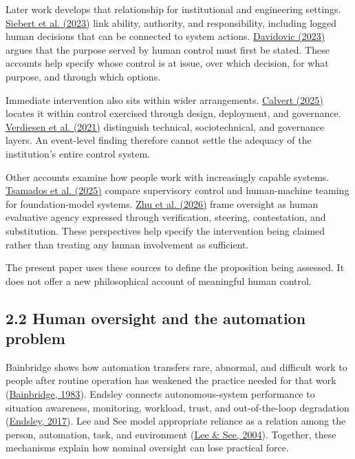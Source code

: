 \documentclass[11pt]{article}
\begin{document}
Later work develops that relationship for institutional and engineering settings. \href{https://doi.org/10.1007/s43681-022-00167-3}{Siebert et al. (2023)} link ability, authority, and responsibility, including logged human decisions that can be connected to system actions. \href{https://doi.org/10.3389/fdata.2022.1017677}{Davidovic (2023)} argues that the purpose served by human control must first be stated. These accounts help specify whose control is at issue, over which decision, for what purpose, and through which options.

Immediate intervention also sits within wider arrangements. \href{https://doi.org/10.1007/s11948-025-00554-z}{Calvert (2025)} locates it within control exercised through design, deployment, and governance. \href{https://doi.org/10.1007/s11023-020-09532-9}{Verdiesen et al. (2021)} distinguish technical, sociotechnical, and governance layers. An event-level finding therefore cannot settle the adequacy of the institution's entire control system.

Other accounts examine how people work with increasingly capable systems. \href{https://doi.org/10.1007/s43681-024-00489-4}{Tsamados et al. (2025)} compare supervisory control and human-machine teaming for foundation-model systems. \href{https://doi.org/10.1007/s43681-026-01147-7}{Zhu et al. (2026)} frame oversight as human evaluative agency expressed through verification, steering, contestation, and substitution. These perspectives help specify the intervention being claimed rather than treating any human involvement as sufficient.

The present paper uses these sources to define the proposition being assessed. It does not offer a new philosophical account of meaningful human control.

\subsection*{2.2 Human oversight and the automation problem}

Bainbridge shows how automation transfers rare, abnormal, and difficult work to people after routine operation has weakened the practice needed for that work (\href{https://doi.org/10.1016/0005-1098(83)90046-8}{Bainbridge, 1983}). Endsley connects autonomous-system performance to situation awareness, monitoring, workload, trust, and out-of-the-loop degradation (\href{https://doi.org/10.1177/0018720816681350}{Endsley, 2017}). Lee and See model appropriate reliance as a relation among the person, automation, task, and environment (\href{https://doi.org/10.1518/hfes.46.1.50_30392}{Lee \& See, 2004}). Together, these mechanisms explain how nominal oversight can lose practical force.
\end{document}
